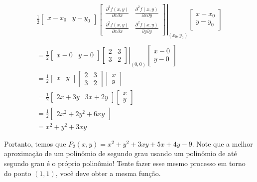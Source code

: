 \documentclass[
  portuguese,
  letterpaper,
  DIV=11,
  numbers=noendperiod]{scrreport}
\begin{document}
\[
\begin{aligned}
& \frac{1}{2} \begin{bmatrix} x-x_0 & y-y_0 \end{bmatrix}
\left. \begin{bmatrix} \frac{\partial^2 f(x,y)}{\partial x\partial x} & \frac{\partial^2 f(x,y)}{\partial x\partial y}\\ 
      \frac{\partial^2f(x,y)}{\partial x\partial x} & \frac{\partial^2f(x,y)}{\partial y\partial y} \end{bmatrix}
      \right |_{(x_0,y_0)}
\begin{bmatrix} x-x_0 \\ y-y_0 \end{bmatrix} & \\ \\
& = \frac{1}{2} \begin{bmatrix} x-0 & y-0 \end{bmatrix}
\left. \begin{bmatrix} 2 & 3\\ 
           3 & 2 \end{bmatrix}
           \right |_{(0,0)}
\begin{bmatrix} x-0 \\ y-0 \end{bmatrix} & \\
& = \frac{1}{2} \begin{bmatrix} x & y \end{bmatrix}
\begin{bmatrix} 2 & 3 \\ 3 & 2 \end{bmatrix}
\begin{bmatrix} x \\ y \end{bmatrix} & \\
& = \frac{1}{2} \begin{bmatrix} 2x+3y & 3x+2y \end{bmatrix}
\begin{bmatrix} x \\ y \end{bmatrix} & \\
& = \frac{1}{2} \begin{bmatrix} 2x^2+2y^2+6xy \end{bmatrix} &\\
& = x^2+y^2+3xy &
\end{aligned}
\]

Portanto, temos que \(P_2(x,y) = x^2+y^2+3xy+5x+4y-9\). Note que a
melhor aproximação de um polinômio de segundo grau usando um polinômio
de até segundo grau é o próprio polinômio! Tente fazer esse mesmo
processo em torno do ponto \((1,1)\), você deve obter a mesma função.
\end{document}
